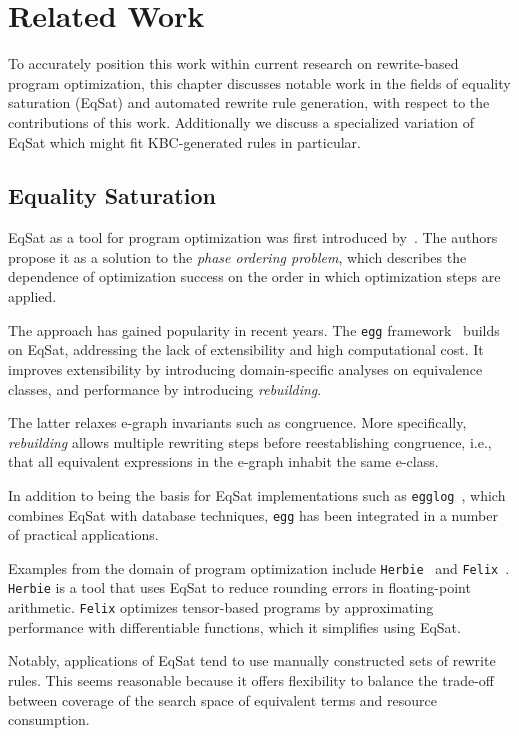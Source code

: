 \chapter{Related Work}

To accurately position this work within current research on rewrite-based program optimization, this chapter discusses notable work in the fields of equality saturation (EqSat) and automated rewrite rule generation, with respect to the contributions of this work. Additionally we discuss a specialized variation of EqSat which might fit KBC-generated rules in particular.

\section{Equality Saturation}
EqSat as a tool for program optimization was first introduced by~\cite{Tate_2011}. The authors propose it as a solution to the \emph{phase ordering problem}, which describes the dependence of optimization success on the order in which optimization steps are applied. 

The approach has gained popularity in recent years. The \texttt{egg} framework~\citep{Willsey_2021} builds on EqSat, addressing the lack of extensibility and high computational cost. It improves extensibility by introducing domain-specific analyses on equivalence classes, and performance by introducing \emph{rebuilding}.

The latter relaxes e-graph invariants such as congruence. More specifically, \emph{rebuilding} allows multiple rewriting steps before reestablishing congruence, i.e., that all equivalent expressions in the e-graph inhabit the same e-class. 

In addition to being the basis for EqSat implementations such as \texttt{egglog}~\citep{zhang2023bettertogetherunifyingdatalog}, which combines EqSat with database techniques, \texttt{egg} has been integrated in a number of practical applications.

Examples from the domain of program optimization include \texttt{Herbie}~\citep{herbie} and \texttt{Felix}~\citep{Felix}. \texttt{Herbie} is a tool that uses EqSat to reduce rounding errors in floating-point arithmetic. \texttt{Felix} optimizes tensor-based programs by approximating performance with differentiable functions, which it simplifies using EqSat.

Notably, applications of EqSat tend to use manually constructed sets of rewrite rules. This seems reasonable because it offers flexibility to balance the trade-off between coverage of the search space of equivalent terms and resource consumption. 

